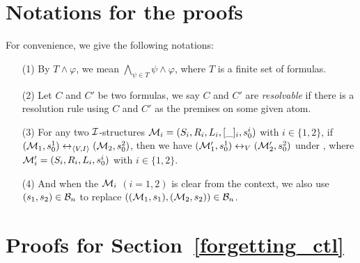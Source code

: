 \documentclass[twoside,11pt]{article}
\begin{document}
	
	
	
	\vskip 0.2in
	
	
	
	
	\clearpage
	\appendix
	\renewcommand{\appendixname}{Appendix~\Alph{section}}
	
	
	\section{Notations for the proofs}
	
	For convenience, we give the following notations:
	\begin{itemize}
		\item[(1)] By $T \wedge \varphi$, we mean $\bigwedge_{\psi\in T} \psi \wedge \varphi$, where $T$ is a finite set of formulas.
		\item[(2)] Let $C$ and $C'$ be two formulas, we say $C$ and $C'$ are \emph{resolvable} if there is a resolution rule using $C$ and $C'$ as the premises on some given atom.
		\item[(3)] For any two ${\cal I}$-structures ${\cal M}_i=(S_i, R_i, L_i, [\_]_i, s_0^i)$ with $i\in \{1, 2\}$, if $({\cal M}_1, s_0^1) \leftrightarrow_{{\langle{V,I}\rangle}} ({\cal M}_2, s_0^2)$, then we have $({\cal M}_1', s_0^1) \leftrightarrow_V ({\cal M}_2', s_0^2)$ under \CTL, where ${\cal M}_i'=(S_i, R_i, L_i, s_0^i)$ with $i\in \{1, 2\}$.
		\item[(4)]
		And when the ${\cal M}_i$ $(i=1,2)$ is clear from the context, we also use $(s_1, s_2)\in {\cal B}_n$ to replace $(({\cal M}_1,s_1),({\cal M}_2,s_2))\in {\cal B}_n$.
	\end{itemize}
	
	
	
	
	
	\section{Proofs for Section~\ref{forgetting_ctl}}
	
\end{document}
